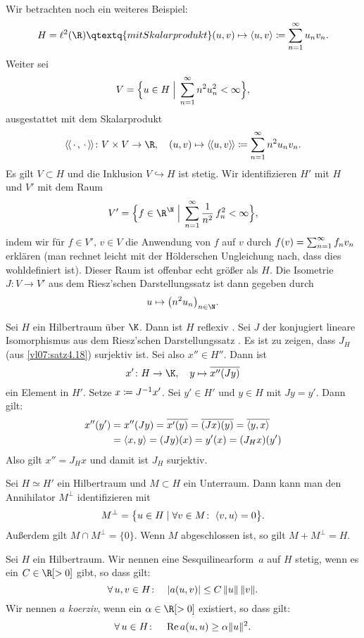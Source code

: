 Wir betrachten noch ein weiteres Beispiel:
\[ H = \ell^2(\R) \qtextq{mit Skalarprodukt}
    (u,v)\mapsto\SP{u,v}\defeq\nsum^\infty u_n v_n  
. \]
Weiter sei
\[ V = \Bigl\{ u\in H \;\Big\vert\; \sum_{n=1}^\infty n^2 u_n^2 < \infty \Bigr\}  , \]
ausgestattet mit dem Skalarprodukt
\[ \dSP{\scdot,\scdot}\colon V\times V\to\R, \quad
    (u,v)\mapsto \dSP{u,v} \defeq \nsum^\infty n^2 u_n v_n
. \]
Es gilt $V\subset H$ und die Inklusion $V\hookrightarrow H$ ist stetig.
Wir identifizieren $H'$ mit $H$ und $V'$ mit dem Raum
\[ V' = \Bigl\{ f\in\R^\N \cMid\Big
    \nsum^\infty \frac{1}{n^2}\, f_n^2 < \infty \Bigr\}
, \]
indem wir für $f\in V',\,v\in V$ die Anwendung von $f$ auf $v$ durch 
$f(v) = \sum_{n=1}^\infty f_n v_n$ erklären (man rechnet leicht mit der 
Hölderschen Ungleichung nach, dass dies wohldefiniert ist).
Dieser Raum ist offenbar echt größer als $H$. Die Isometrie $J\colon V\to V'$
aus dem Riesz'schen Darstellungssatz  ist dann gegeben durch 
\[ u \mapsto \bigl( n^2 u_n \bigr)_{n\in\N} . \]

\begin{thBemerkung} \label{vl13:hilbertraumreflexiv}
    Sei $H$ ein Hilbertraum über $\K$. Dann ist $H$ reflexiv
    .
    Sei $J$ der konjugiert lineare
    Isomorphismus aus dem Riesz'schen Darstellungssatz .
    Es ist zu zeigen, dass $J_H$ (aus \cref{vl07:satz4.18}) surjektiv ist.
    Sei also $x''\in H''$. Dann ist
    \[ x'\colon H\to\K,\quad  y \mapsto  \ol{x''(Jy)} \]
    ein Element in $H'$. Setze $x \coloneqq J^{-1}x'$. Sei $y'\in H'$ und $y\in H$
    mit $Jy = y'$. Dann gilt:
    \begin{align*}
        x''(y') 
        &= x''(Jy) = \overline{x'(y)} = \overline{(Jx)(y)} = \overline{\left\langle y,x\right\rangle}  \\
        &= \left\langle x,y\right\rangle = (Jy)(x) = y'(x) = (J_Hx)(y')
    \end{align*}
    Also gilt $x'' = J_Hx$ und damit ist $J_H$ surjektiv.
\end{thBemerkung}

\begin{thBemerkung}
    Sei $H\simeq H'$ ein Hilbertraum und $M\subset H$ ein Unterraum. Dann kann
    man den Annihilator $M^\perp$ identifizieren mit
    \[ M^\perp = \bigl\{ u\in H \Mid \forall v\in M\colon\; \SP{v,u} = 0 \bigr\}
    . \]
    Außerdem gilt $M\cap M^\perp = \{0\}$. Wenn $M$ abgeschlossen ist, so gilt
    $M + M^\perp = H$.
\end{thBemerkung}

\begin{thDef} \label{vl13:def:sesquisetetigkorerziv}
    Sei $H$ ein Hilbertraum. Wir nennen eine Sesquilinearform~$a$ auf $H$
    stetig, wenn es ein $C\in\R[>0]$ gibt, so dass gilt: 
    \[ \forall\,u,v\in H\colon\quad \lvert a(u,v)\rvert \leq C \,\lVert u\rVert\,\lVert v\rVert  
    . \]
    Wir nennen $a$ \emph{koerziv}, wenn ein $\alpha\in\R[>0]$ existiert, so dass
    gilt:
    \[ \forall\,u\in H\colon\quad \operatorname{Re} a(u,u) \geq \alpha\lVert u\rVert^2  . \]
\end{thDef}


